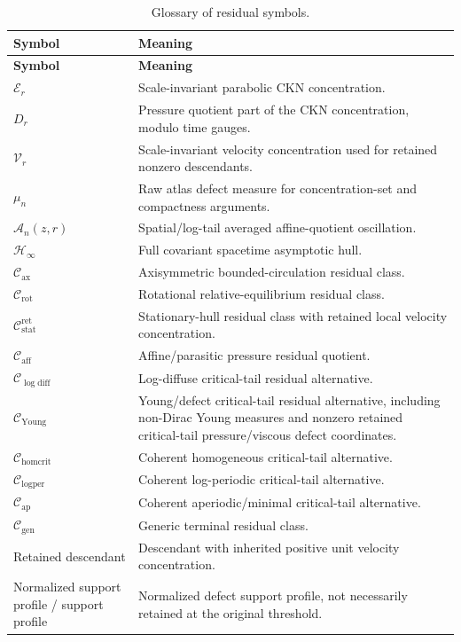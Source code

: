 \documentclass[11pt]{amsart}
\numberwithin{equation}{section}
\theoremstyle{plain}
\theoremstyle{definition}
\theoremstyle{remark}
\newcommand{\calE}{\mathcal E}
\newcommand{\Vel}{\mathcal V}
\newcommand{\calH}{\mathcal H}
\newcommand{\Cax}{\mathcal C_{\mathrm{ax}}}
\newcommand{\Crot}{\mathcal C_{\mathrm{rot}}}
\newcommand{\Cstat}{\mathcal C_{\mathrm{stat}}^{\mathrm{ret}}}
\newcommand{\Caff}{\mathcal C_{\mathrm{aff}}}
\newcommand{\Cgen}{\mathcal C_{\mathrm{gen}}}
\newcommand{\Chomcrit}{\mathcal C_{\mathrm{homcrit}}}
\newcommand{\Clogper}{\mathcal C_{\mathrm{logper}}}
\newcommand{\Capcrit}{\mathcal C_{\mathrm{ap}}}
\newcommand{\Cyoung}{\mathcal C_{\mathrm{Young}}}
\newcommand{\Clogdiff}{\mathcal C_{\log\mathrm{diff}}}
\begin{document}
\begin{longtable}{@{}L{0.28\textwidth}L{0.66\textwidth}@{}}
\caption{Glossary of residual symbols.}
\label{tab:paperIV-glossary}\\
\hline
\textbf{Symbol} & \textbf{Meaning}\\
\hline
\endfirsthead
\hline
\textbf{Symbol} & \textbf{Meaning}\\
\hline
\endhead
\hline
\endfoot
\(\calE_r\) & Scale-invariant parabolic CKN concentration.\\
\(D_r\) & Pressure quotient part of the CKN concentration, modulo time gauges.\\
\(\Vel_r\) & Scale-invariant velocity concentration used for retained
nonzero descendants.\\
\(\mu_n\) & Raw atlas defect measure for concentration-set and compactness
arguments.\\
\(\mathcal A_n(z,r)\) & Spatial/log-tail averaged affine-quotient oscillation.\\
\(\calH_\infty\) & Full covariant spacetime asymptotic hull.\\
\(\Cax\) & Axisymmetric bounded-circulation residual class.\\
\(\Crot\) & Rotational relative-equilibrium residual class.\\
\(\Cstat\) & Stationary-hull residual class with retained local velocity concentration.\\
\(\Caff\) & Affine/parasitic pressure residual quotient.\\
\(\Clogdiff\) & Log-diffuse critical-tail residual alternative.\\
\(\Cyoung\) & Young/defect critical-tail residual alternative, including
non-Dirac Young measures and nonzero retained critical-tail pressure/viscous
defect coordinates.\\
\(\Chomcrit\) & Coherent homogeneous critical-tail alternative.\\
\(\Clogper\) & Coherent log-periodic critical-tail alternative.\\
\(\Capcrit\) & Coherent aperiodic/minimal critical-tail alternative.\\
\(\Cgen\) & Generic terminal residual class.\\
Retained descendant & Descendant with inherited positive unit velocity concentration.\\
Normalized support profile / support profile & Normalized defect
support profile, not necessarily retained at the original threshold.\\

\end{longtable}
\end{document}
